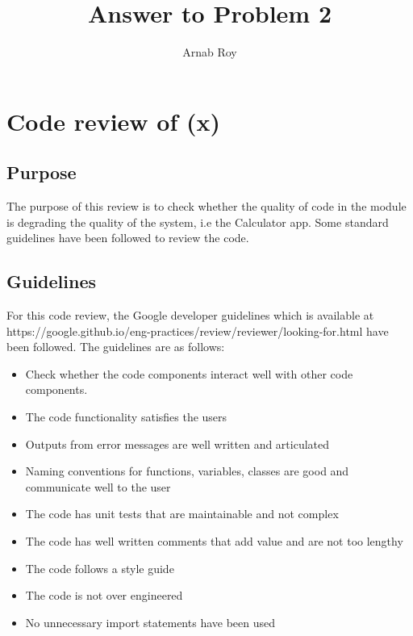 \documentclass[12pt]{article}
\title{Answer to Problem 2}
\author{Arnab Roy}
\begin{document}
\maketitle

\section{Code review of \Gamma(x)}
\subsection{Purpose}
The purpose of this review is to check whether the quality of code in the module is degrading the quality of the system, i.e the Calculator app. Some standard guidelines have been followed to review the code. 
\subsection{Guidelines}
For this code review, the Google developer guidelines which is available at https://google.github.io/eng-practices/review/reviewer/looking-for.html have been followed. The guidelines are as follows:
\begin{itemize}
    \item Check whether the code components interact well with other code components.
    \item The code functionality satisfies the users
    \item Outputs from error messages are well written and articulated
    \item Naming conventions for functions, variables, classes are good and communicate well to the user
    \item The code has unit tests that are maintainable and not complex
    \item The code has well written comments that add value and are not too lengthy
    \item The code follows a style guide
    \item The code is not over engineered
    \item No unnecessary import statements have been used
\end{itemize}
\end{document}
